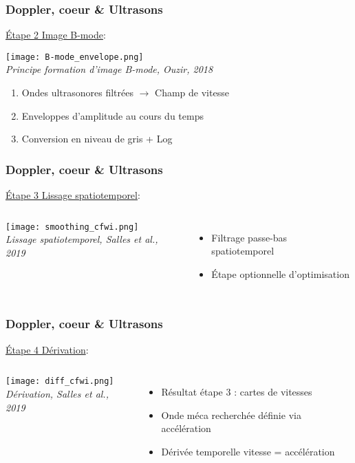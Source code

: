 \documentclass{beamer}
\begin{document}
\begin{frame}
\frametitle{Doppler, coeur \& Ultrasons}
\underline{\'Etape 2 Image B-mode}:

\begin{center}
\texttt{[image: B-mode\_envelope.png]}\\
\textit{\footnotesize Principe formation d'image B-mode, Ouzir, 2018}
\end{center}
\vspace{0.2cm}
\begin{enumerate}
\item Ondes ultrasonores filtrées $\rightarrow$ Champ de vitesse
\vspace{0.2cm}
\item Enveloppes d'amplitude au cours du temps
\vspace{0.2cm}
\item Conversion en niveau de gris + Log
\end{enumerate}
\end{frame}

\begin{frame}
\frametitle{Doppler, coeur \& Ultrasons}
\underline{\'Etape 3 Lissage spatiotemporel}:
\begin{columns}
\column{60mm}
\begin{center}
\texttt{[image: smoothing\_cfwi.png]}\\
\textit{\footnotesize Lissage spatiotemporel, Salles et al., 2019}
\end{center}
\column{60mm}
\vspace{0.2cm}
\begin{itemize}
\item Filtrage passe-bas spatiotemporel
\vspace{0.8cm}
\item \'Etape optionnelle d'optimisation

\end{itemize}
\end{columns}
\end{frame}

\begin{frame}
\frametitle{Doppler, coeur \& Ultrasons}
\underline{\'Etape 4 Dérivation}:
\begin{columns}
\column{60mm}
\begin{center}
\texttt{[image: diff\_cfwi.png]}\\
\textit{\footnotesize Dérivation, Salles et al., 2019}
\end{center}
\column{60mm}
\vspace{0.2cm}
\begin{itemize}
\item Résultat étape 3 : cartes de vitesses
\vspace{0.5cm}
\item Onde méca recherchée définie via accélération
\vspace{0.5cm}
\item Dérivée temporelle vitesse = accélération
\end{itemize}
\end{columns}
\end{frame}
\end{document}
